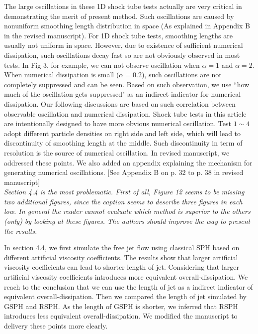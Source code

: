 \documentclass[10pt,a4paper]{article}
\begin{document}
The large oscillations in these 1D shock tube tests actually are very critical in demonstrating the merit of present method. Such oscillations are caused by nonuniform smoothing length distribution in space (As explained in Appendix B in the revised manuscript). For 1D shock tube tests, smoothing lengths are usually not uniform in space. However, due to existence of sufficient numerical dissipation, such oscillations decay fast so are not obviously observed in most tests. In Fig 3, for example, we can not observe oscillation when $\alpha =1$ and $\alpha = 2$. When numerical dissipation is small ($\alpha = 0.2$), such oscillations are not completely suppressed and can be seen. Based on such observation, we use ``how much of the oscillation gets suppressed" as an indirect indicator for numerical dissipation. Our following discussions are based on such correlation between observable oscillation and numerical dissipation. Shock tube tests in this article are intentionally designed to have more obvious numerical oscillation. Test $1 \sim 4$ adopt different particle densities on right side and left side, which will lead to discontinuity of smoothing length at the middle. Such discontinuity in term of resolution is the source of numerical oscillation. In revised manuscript, we addressed these points. We also added an appendix explaining the mechanism for generating numerical oscillations. 
[See Appendix B on p. 32 to p. 38 in revised manuscript]
\\[3pt]

\textit{Section 4.4 is the most problematic. First of all, Figure 12 seems to be missing two additional figures, since the caption seems to describe three figures in each low. In general the reader cannot evaluate which method is superior to the others (only) by looking at these figures. The authors should improve the way to present the results.} 

In section 4.4, we first simulate the free jet flow using classical SPH based on different artificial viscosity coefficients. The results show that larger artificial viscosity coefficients can lead to shorter length of jet. Considering that larger artificial viscosity coefficients introduces more equivalent overall-dissipation. We reach to the conclusion that we can use the length of jet as a indirect indicator of equivalent overall-dissipation. 
Then we compared the length of jet simulated by GSPH and RSPH. As the length of GSPH is shorter, we inferred that RSPH introduces less equivalent overall-dissipation.
We modified the manuscript to delivery these points more clearly.
 
\end{document}

